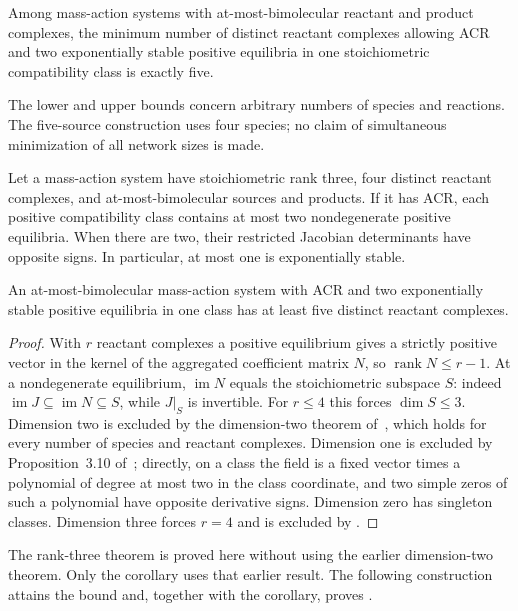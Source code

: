 \documentclass[11pt,a4paper]{report}
\providecommand{\rank}{\operatorname{rank}}
\providecommand{\im}{\operatorname{im}}
\begin{document}
\begin{theorem}\label{thm:minimum}
Among mass-action systems with at-most-bimolecular reactant and product complexes, the minimum number
of distinct reactant complexes allowing ACR and two exponentially stable positive equilibria in one
stoichiometric compatibility class is exactly five.
\end{theorem}
The lower and upper bounds concern arbitrary numbers of species and reactions. The five-source
construction uses four species; no claim of simultaneous minimization of all network sizes is made.

\begin{theorem}\label{thm:main}
Let a mass-action system have stoichiometric rank three, four distinct reactant complexes, and
at-most-bimolecular sources and products. If it has ACR, each positive compatibility class contains at most
two nondegenerate positive equilibria. When there are two, their restricted Jacobian determinants have
opposite signs. In particular, at most one is exponentially stable.
\end{theorem}

\begin{corollary}\label{cor:five}
An at-most-bimolecular mass-action system with ACR and two exponentially stable positive equilibria in one
class has at least five distinct reactant complexes.
\end{corollary}
\begin{proof}
With $r$ reactant complexes a positive equilibrium gives a strictly positive vector in the kernel of
the aggregated coefficient matrix $N$, so $\rank N\le r-1$. At a nondegenerate equilibrium,
$\im N$ equals the stoichiometric subspace $S$: indeed $\im J\subseteq\im N\subseteq S$, while
$J|_S$ is invertible. For $r\le4$ this forces $\dim S\le3$. Dimension two is excluded by the
dimension-two theorem of~\autocite{Prior2026}, which holds for every number of species and reactant
complexes. Dimension one is excluded by Proposition~3.10 of~\autocite{KNS2024}; directly, on a class the
field is a fixed vector times a polynomial of degree at most two in the class coordinate, and two
simple zeros of such a polynomial have opposite derivative signs. Dimension zero has singleton classes.
Dimension three forces $r=4$ and is excluded by .
\end{proof}
The rank-three theorem is proved here without using the earlier dimension-two theorem. Only the
corollary uses that earlier result. The following construction attains the bound and, together with
the corollary, proves .
\end{document}

